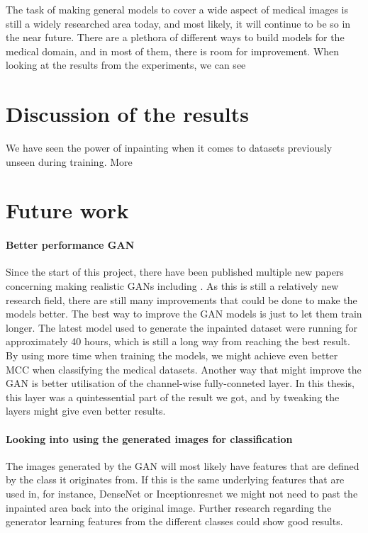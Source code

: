 The task of making general models to cover a wide aspect of medical images is still a widely researched area today, and most likely, it will continue to be so in the near future. There are a  plethora of different ways to build models for the medical domain, and in most of them, there is room for improvement.
When looking at the results from the experiments, we can see 

\section{Discussion of the results}
We have seen the power of inpainting when it comes to datasets previously unseen during training.
More
\section{Future work}


\paragraph{Better performance GAN}
Since the start of this project, there have been published multiple new papers concerning making realistic GANs including \cite{DBLP:journals/corr/abs-1809-11096} \cite{DBLP:journals/corr/abs-1812-04948}. As this is still a relatively new research field, there are still many improvements that could be done to make the models better.
The best way to improve the GAN models is just to let them train longer. The latest model used to generate the inpainted dataset were running for approximately 40 hours, which is still a long way from reaching the best result. By using more time when training the models, we might achieve even better MCC when classifying the medical datasets.
Another way that might improve the GAN is better utilisation of the channel-wise fully-conneted layer. In this thesis, this layer was a quintessential part of the result we got, and by tweaking the layers might give even better results.


\paragraph{Looking into using the generated images for classification}
The images generated by the GAN will most likely have features that are defined by the class it originates from. If this is the same underlying features that are used in, for instance, DenseNet or Inceptionresnet we might not need to past the inpainted area back into the original image.
Further research regarding the generator learning features from the different classes could show good results.

